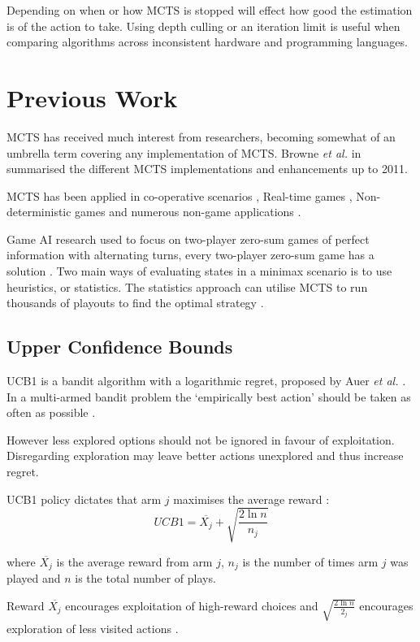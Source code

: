 \documentclass[conference]{IEEEtran}
\begin{document}
Depending on when or how MCTS is stopped will effect how good the estimation is of the action to take. Using depth culling or an iteration limit is useful when comparing algorithms across inconsistent hardware and programming languages.

\section{Previous Work}
MCTS has received much interest from researchers, becoming somewhat of an umbrella term covering any implementation of MCTS. Browne {\em et al.} in \cite{mctssurvey} summarised the different MCTS implementations and enhancements up to 2011.

MCTS has been applied in co-operative scenarios \cite{tinycoop}, Real-time games \cite{mctssurvey}, Non-deterministic games \cite{ismcts} and numerous non-game applications \cite{mctssurvey}.

Game AI research used to focus on two-player zero-sum games of perfect information with alternating turns\cite{mctssurvey}, every two-player zero-sum game has a solution \cite{bartle}. Two main ways of evaluating states in a minimax scenario is to use heuristics, or statistics. The statistics approach can utilise MCTS to run thousands of playouts to find the optimal strategy \cite{bartle}.

\subsection{Upper Confidence Bounds}
UCB1 is a bandit algorithm with a logarithmic regret, proposed by Auer {\em et al.} \cite{ucb1}. In a multi-armed bandit problem the `empirically best action' should be taken as often as possible \cite{ucb1}. 

However less explored options should not be ignored in favour of exploitation. Disregarding exploration may leave better actions unexplored and thus increase regret. 

UCB1 policy dictates that arm $j$ maximises the average reward \cite{ucb1}:
\[UCB1 = \overline{X_{j}} + \sqrt{\frac{2 \ln n}{n_{j}}}\]

where $\overline{X_{j}}$ is the average reward from arm $j$, $n_{j}$ is the number of times arm $j$ was played and $n$ is the total number of plays.

Reward $\overline{X_{j}}$ encourages exploitation of high-reward choices \cite{ucb1} and $\sqrt{\frac{2 \ln n}{2_{j}}}$ encourages exploration of less visited actions \cite{mctssurvey}.
\end{document}
